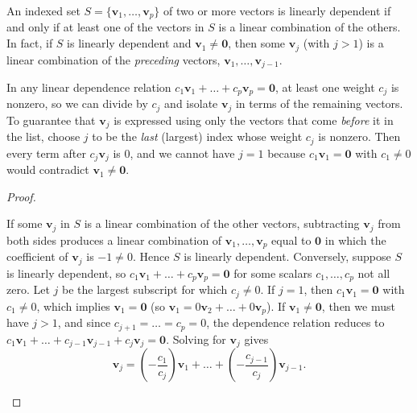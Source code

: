 \documentclass[10pt]{scrartcl}
\newcommand{\vv}[1]{\mathbf{#1}}
\begin{document}
\begin{theorem*}
  An indexed set $S=\{\vv v_1,\dots,\vv v_p\}$ of two or more vectors is linearly dependent if and only if at least one of the vectors in $S$ is a linear combination of the others. In fact, if $S$ is linearly dependent and $\vv v_1\ne\vv 0$, then some $\vv v_j$ (with $j>1$) is a linear combination of the \emph{preceding} vectors, $\vv v_1,\dots,\vv v_{j-1}$.
\end{theorem*}
\begin{ideabox}
  In any linear dependence relation $c_1\vv v_1+\dots+c_p\vv v_p=\vv 0$, at least one weight $c_j$ is nonzero, so we can divide by $c_j$ and isolate $\vv v_j$ in terms of the remaining vectors. To guarantee that $\vv v_j$ is expressed using only the vectors that come \emph{before} it in the list, choose $j$ to be the \emph{last} (largest) index whose weight $c_j$ is nonzero. Then every term after $c_j\vv v_j$ is $0$, and we cannot have $j=1$ because $c_1\vv v_1=\vv 0$ with $c_1\ne 0$ would contradict $\vv v_1\ne\vv 0$.
\end{ideabox}
\begin{proof}
  \begin{steps}
    \ii If some $\vv v_j$ in $S$ is a linear combination of the other vectors, subtracting $\vv v_j$ from both sides produces a linear combination of $\vv v_1,\dots,\vv v_p$ equal to $\vv 0$ in which the coefficient of $\vv v_j$ is $-1\ne 0$. Hence $S$ is linearly dependent.
    \ii Conversely, suppose $S$ is linearly dependent, so $c_1\vv v_1+\dots+c_p\vv v_p=\vv 0$ for some scalars $c_1,\dots,c_p$ not all zero. Let $j$ be the largest subscript for which $c_j\ne 0$.
    \ii If $j=1$, then $c_1\vv v_1=\vv 0$ with $c_1\ne 0$, which implies $\vv v_1=\vv 0$ (so $\vv v_1=0\vv v_2+\dots+0\vv v_p$).
    \ii If $\vv v_1\ne\vv 0$, then we must have $j>1$, and since $c_{j+1}=\dots=c_p=0$, the dependence relation reduces to $c_1\vv v_1+\dots+c_{j-1}\vv v_{j-1}+c_j\vv v_j=\vv 0$. Solving for $\vv v_j$ gives
    \[
      \vv v_j = \left(-\frac{c_1}{c_j}\right)\vv v_1 + \dots + \left(-\frac{c_{j-1}}{c_j}\right)\vv v_{j-1}.
    \]
  \end{steps}
\end{proof}
\end{document}
